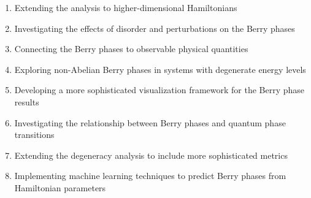 \documentclass[12pt,a4paper]{article}
\begin{document}
\begin{enumerate}
    \item Extending the analysis to higher-dimensional Hamiltonians
    \item Investigating the effects of disorder and perturbations on the Berry phases
    \item Connecting the Berry phases to observable physical quantities
    \item Exploring non-Abelian Berry phases in systems with degenerate energy levels
    \item Developing a more sophisticated visualization framework for the Berry phase results
    \item Investigating the relationship between Berry phases and quantum phase transitions
    \item Extending the degeneracy analysis to include more sophisticated metrics
    \item Implementing machine learning techniques to predict Berry phases from Hamiltonian parameters
\end{enumerate}
\end{document}
